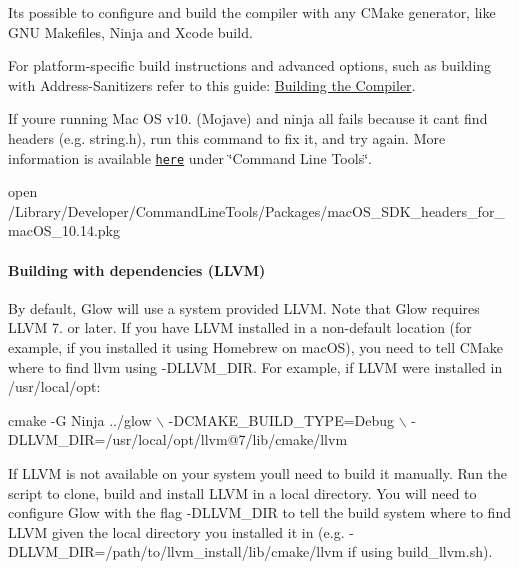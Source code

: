 It\textquotesingle{}s possible to configure and build the compiler with any C\+Make generator, like G\+NU Makefiles, Ninja and Xcode build.

For platform-\/specific build instructions and advanced options, such as building with Address-\/\+Sanitizers refer to this guide\+: \hyperlink{md_docs__building}{Building the Compiler}.

If you\textquotesingle{}re running Mac OS v10. (Mojave) and {\ttfamily ninja all} fails because it can\textquotesingle{}t find headers (e.\+g. {\ttfamily string.\+h}), run this command to fix it, and try again. More information is available \href{https://developer.apple.com/documentation/xcode_release_notes/xcode_10_release_notes}{\tt here} under \char`\"{}\+Command Line Tools\char`\"{}.


\begin{DoxyCode}
open /Library/Developer/CommandLineTools/Packages/macOS\_SDK\_headers\_for\_macOS\_10.14.pkg
\end{DoxyCode}


\paragraph*{Building with dependencies (L\+L\+VM)}

By default, Glow will use a system provided L\+L\+VM. Note that Glow requires L\+L\+VM 7. or later. If you have L\+L\+VM installed in a non-\/default location (for example, if you installed it using Homebrew on mac\+OS), you need to tell C\+Make where to find llvm using {\ttfamily -\/\+D\+L\+L\+V\+M\+\_\+\+D\+IR}. For example, if L\+L\+VM were installed in {\ttfamily /usr/local/opt}\+:


\begin{DoxyCode}
cmake -G Ninja ../glow \(\backslash\)
    -DCMAKE\_BUILD\_TYPE=Debug \(\backslash\)
    -DLLVM\_DIR=/usr/local/opt/llvm@7/lib/cmake/llvm
\end{DoxyCode}


If L\+L\+VM is not available on your system you\textquotesingle{}ll need to build it manually. Run the script  to clone, build and install L\+L\+VM in a local directory. You will need to configure Glow with the flag {\ttfamily -\/\+D\+L\+L\+V\+M\+\_\+\+D\+IR} to tell the build system where to find L\+L\+VM given the local directory you installed it in (e.\+g. {\ttfamily -\/\+D\+L\+L\+V\+M\+\_\+\+D\+IR=/path/to/llvm\+\_\+install/lib/cmake/llvm} if using {\ttfamily build\+\_\+llvm.\+sh}).

